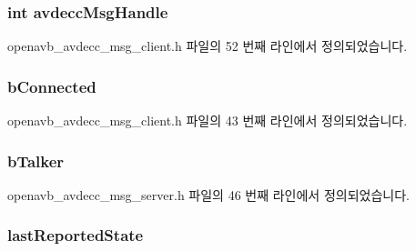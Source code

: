 \subsubsection[{\texorpdfstring{avdecc\+Msg\+Handle}{avdeccMsgHandle}}]{\setlength{\rightskip}{0pt plus 5cm}int avdecc\+Msg\+Handle}\hypertarget{struct__avdecc__msg__state_a0ec8286c7813affa4fbe99bc5ce31f5a}{}\label{struct__avdecc__msg__state_a0ec8286c7813affa4fbe99bc5ce31f5a}


openavb\+\_\+avdecc\+\_\+msg\+\_\+client.\+h 파일의 52 번째 라인에서 정의되었습니다.

\subsubsection[{\texorpdfstring{b\+Connected}{bConnected}}]{ b\+Connected}\hypertarget{struct__avdecc__msg__state_a27fec7db63617379ec20651b83d27fc7}{}\label{struct__avdecc__msg__state_a27fec7db63617379ec20651b83d27fc7}


openavb\+\_\+avdecc\+\_\+msg\+\_\+client.\+h 파일의 43 번째 라인에서 정의되었습니다.

\subsubsection[{\texorpdfstring{b\+Talker}{bTalker}}]{ b\+Talker}\hypertarget{struct__avdecc__msg__state_a0d87b8d47bb02e4d8e93b056d72f870c}{}\label{struct__avdecc__msg__state_a0d87b8d47bb02e4d8e93b056d72f870c}


openavb\+\_\+avdecc\+\_\+msg\+\_\+server.\+h 파일의 46 번째 라인에서 정의되었습니다.

\subsubsection[{\texorpdfstring{last\+Reported\+State}{lastReportedState}}]{ last\+Reported\+State}\hypertarget{struct__avdecc__msg__state_a9e84fb07ee536b1bca410ee6c9eebea5}{}\label{struct__avdecc__msg__state_a9e84fb07ee536b1bca410ee6c9eebea5}


